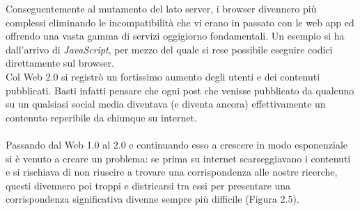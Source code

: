 \documentclass[a4paper, 11pt, oneside]{book}
\theoremstyle{plain}
\begin{document}
\begin{center}
{
}
\end{center}
Conseguentemente al mutamento del lato server, i browser divennero  più complessi eliminando le incompatibilità che vi erano in passato con le web app ed offrendo una vasta gamma di servizi oggigiorno fondamentali. Un esempio si ha dall'arrivo di \textit{JavaScript}, per mezzo del quale si rese possibile eseguire codici direttamente sul browser. \\ Col Web 2.0 si registrò un fortissimo aumento degli utenti e dei contenuti pubblicati. Basti infatti pensare che ogni post che venisse pubblicato da qualcuno su un qualsiasi social media diventava (e diventa ancora) effettivamente un contenuto reperibile da chiunque su internet.\\\\
Passando dal Web 1.0 al 2.0 e continuando esso a crescere in modo esponenziale si è venuto a creare un problema: se prima su internet scarseggiavano i contenuti e si rischiava di non riuscire a trovare una corrispondenza alle nostre ricerche, questi divennero poi troppi e districarsi tra essi per presentare una corrispondenza significativa divenne sempre più difficile (Figura 2.5).\\\\
\end{document}
